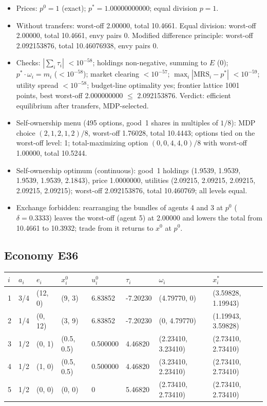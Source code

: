 \begin{itemize}[leftmargin=1.2em,itemsep=0pt,topsep=2pt]\footnotesize
\item Prices: $p^0 = 1$ (exact); $p^* = 1.00000000000$; equal division $p = 1$.
\item Without transfers: worst-off 2.00000, total 10.4661. Equal division: worst-off 2.00000, total 10.4661, envy pairs 0. Modified difference principle: worst-off 2.092153876, total 10.46076938, envy pairs 0.
\item Checks: $|\sum_i\tau_i|$ $<10^{-58}$; holdings non-negative, summing to $E$ (0); $p^*\cdot\omega_i = m_i$ ($<10^{-58}$); market clearing $<10^{-57}$; $\max_i|\mathrm{MRS}_i - p^*|$ $<10^{-59}$; utility spread $<10^{-58}$; budget-line optimality yes; frontier lattice 1001 points, best worst-off 2.000000000 $\leq$ 2.092153876. Verdict: efficient equilibrium after transfers, MDP-selected.
\item Self-ownership menu (495 options, good~1 shares in multiples of $1/8$): MDP choice $(2, 1, 2, 1, 2)/8$, worst-off 1.76028, total 10.4443; options tied on the worst-off level: 1; total-maximizing option $(0, 0, 4, 4, 0)/8$ with worst-off 1.00000, total 10.5244.
\item Self-ownership optimum (continuous): good~1 holdings (1.9539, 1.9539, 1.9539, 1.9539, 2.1843), price 1.0000000, utilities (2.09215, 2.09215, 2.09215, 2.09215, 2.09215); worst-off 2.092153876, total 10.460769; all levels equal.
\item Exchange forbidden: rearranging the bundles of agents 4 and 3 at $p^0$ ($\delta = 0.3333$) leaves the worst-off (agent 5) at 2.00000 and lowers the total from 10.4661 to 10.3932; trade from it returns to $x^0$ at $p^0$.
\end{itemize}

\subsection*{Economy E36}
\label{ec:E36}
{\scriptsize\setlength{\tabcolsep}{3pt}
\begin{tabular}{@{}llllllll@{}}
\toprule
$i$ & $a_i$ & $e_i$ & $x^0_i$ & $u^0_i$ & $\tau_i$ & $\omega_i$ & $x^*_i$ \\
\midrule
1 & 3/4 & (12, 0) & (9, 3) & 6.83852 & -7.20230 & (4.79770, 0) & (3.59828, 1.19943) \\
2 & 1/4 & (0, 12) & (3, 9) & 6.83852 & -7.20230 & (0, 4.79770) & (1.19943, 3.59828) \\
3 & 1/2 & (0, 1) & (0.5, 0.5) & 0.500000 & 4.46820 & (2.23410, 3.23410) & (2.73410, 2.73410) \\
4 & 1/2 & (1, 0) & (0.5, 0.5) & 0.500000 & 4.46820 & (3.23410, 2.23410) & (2.73410, 2.73410) \\
5 & 1/2 & (0, 0) & (0, 0) & 0 & 5.46820 & (2.73410, 2.73410) & (2.73410, 2.73410) \\
\bottomrule\end{tabular}}

